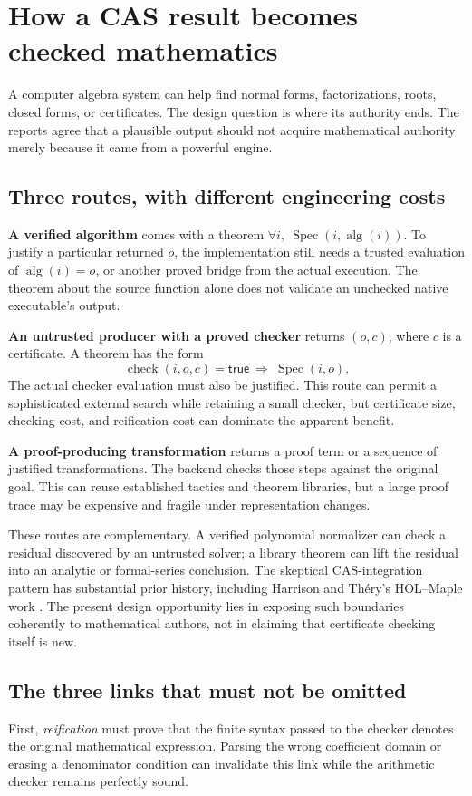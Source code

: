 \documentclass[11pt,letterpaper]{article}
\begin{document}
\section{How a CAS result becomes checked mathematics}\label{sec:cas}
A computer algebra system can help find normal forms, factorizations, roots,
closed forms, or certificates. The design question is where its authority ends.
The reports agree that a plausible output should not acquire mathematical
authority merely because it came from a powerful engine.

\subsection{Three routes, with different engineering costs}
\textbf{A verified algorithm} comes with a theorem
\(\forall i,\ \operatorname{Spec}(i,\operatorname{alg}(i))\). To justify a
particular returned \(o\), the implementation still needs a trusted evaluation
of \(\operatorname{alg}(i)=o\), or another proved bridge from the actual
execution. The theorem about the source function alone does not validate an
unchecked native executable's output.

\textbf{An untrusted producer with a proved checker} returns \((o,c)\), where
\(c\) is a certificate. A theorem has the form
\[
 \operatorname{check}(i,o,c)=\mathsf{true}
       \ \Longrightarrow\ \operatorname{Spec}(i,o).
\]
The actual checker evaluation must also be justified. This route can permit a
sophisticated external search while retaining a small checker, but certificate
size, checking cost, and reification cost can dominate the apparent benefit.

\textbf{A proof-producing transformation} returns a proof term or a sequence of
justified transformations. The backend checks those steps against the original
goal. This can reuse established tactics and theorem libraries, but a large
proof trace may be expensive and fragile under representation changes.

These routes are complementary. A verified polynomial normalizer can check a
residual discovered by an untrusted solver; a library theorem can lift the
residual into an analytic or formal-series conclusion. The skeptical
CAS-integration pattern has substantial prior history, including Harrison and
Th\'ery's HOL--Maple work \cite{skeptic}. The present design opportunity lies in
exposing such boundaries coherently to mathematical authors, not in claiming
that certificate checking itself is new.

\subsection{The three links that must not be omitted}
First, \emph{reification} must prove that the finite syntax passed to the checker
denotes the original mathematical expression. Parsing the wrong coefficient
domain or erasing a denominator condition can invalidate this link while the
arithmetic checker remains perfectly sound.
\end{document}
